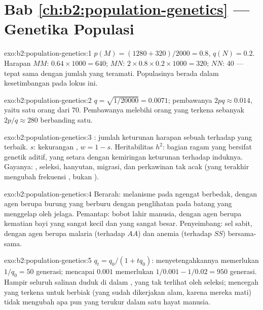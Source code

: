 \section*{Bab \ref{ch:b2:population-genetics} --- Genetika Populasi}

\begin{solution}{exo:b2:population-genetics:1}
$p(M) = (1280 + 320)/2000 = 0.8$, $q(N) = 0.2$. Harapan $MM$:
$0.64\times 1000 = 640$; $MN$: $2\times 0.8\times 0.2\times 1000 =
320$; $NN$: 40 --- tepat sama dengan jumlah yang teramati. Populasinya
berada dalam kesetimbangan pada lokus ini.
\end{solution}

\begin{solution}{exo:b2:population-genetics:2}
$q = \sqrt{1/20000} = 0.0071$; pembawanya $2pq \approx 0.014$, yaitu
satu orang dari 70. Pembawanya melebihi orang yang terkena sebanyak
$2p/q \approx
280$ berbanding satu.
\end{solution}

\begin{solution}{exo:b2:population-genetics:3}
: jumlah keturunan harapan sebuah  terhadap yang
terbaik.  $s$: kekurangan , $w = 1 -
s$.
Heritabilitas $h^{2}$: bagian ragam  yang bersifat genetik
aditif, yang setara dengan kemiringan keturunan terhadap induknya.
Gayanya: , seleksi, hanyutan, migrasi, dan perkawinan tak acak
(yang terakhir mengubah frekuensi , bukan ).
\end{solution}

\begin{solution}{exo:b2:population-genetics:4}
Berarah: melanisme pada ngengat berbedak, dengan agen berupa burung
yang berburu dengan penglihatan pada batang yang menggelap oleh jelaga.
Pemantap: bobot lahir manusia, dengan agen berupa kematian bayi yang
sangat kecil dan yang sangat besar. Penyeimbang: sel sabit, dengan agen
berupa malaria (terhadap $AA$) dan anemia (terhadap $SS$) bersama-sama.
\end{solution}

\begin{solution}{exo:b2:population-genetics:5}
$q_t = q_0/(1 + tq_0)$: menyetengahkannya memerlukan $1/q_0 = 50$
generasi; mencapai $0.001$ memerlukan $1/0.001 - 1/0.02 = 950$
generasi. Hampir seluruh salinan  duduk di dalam ,
yang tak terlihat oleh seleksi; mencegah yang terkena untuk berbiak
(yang sudah dikerjakan alam, karena mereka mati) tidak mengubah apa pun
yang terukur dalam satu hayat manusia.
\end{solution}

